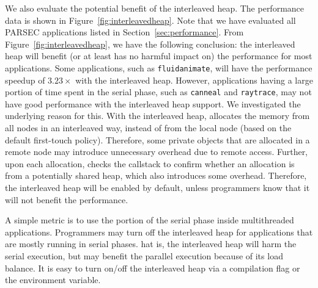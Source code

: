 
We also evaluate the potential benefit of the interleaved heap. The performance data is shown in Figure~\ref{fig:interleavedheap}. Note that we have evaluated all PARSEC applications listed in Section~\ref{sec:performance}.
From Figure~\ref{fig:interleavedheap}, we have the following conclusion: the interleaved heap will benefit (or at least has no harmful impact on) the performance for most applications. Some applications, such as \texttt{fluidanimate}, will have the performance speedup of $3.23\times$ with the interleaved heap. However, applications having a large portion of time spent in the serial phase, such as \texttt{canneal} and \texttt{raytrace}, may not have good performance with the interleaved heap support. 
We investigated the underlying reason for this. With the interleaved heap, \NM{} allocates the memory from all nodes in an interleaved way, instead of from the local node (based on the default first-touch policy). Therefore, some private objects that are allocated in a remote node may introduce unnecessary overhead due to remote access. Further, upon each allocation, \NM{}  checks the callstack to confirm whether an allocation is from a potentially shared heap, which also introduces some overhead. Therefore, the interleaved heap will be enabled by default, unless programmers know that it will not benefit the performance.

A simple metric is to use the portion of the serial phase inside multithreaded applications.  Programmers may turn off the interleaved heap for applications that are mostly running in serial phases.  hat is, the interleaved heap will harm the serial execution, but may benefit the parallel execution because of its load balance. It is easy to turn on/off the interleaved heap via a compilation flag or the environment variable.  








